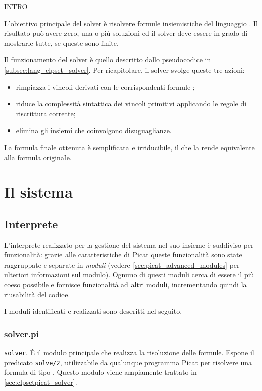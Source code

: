 \documentclass[12pt,a4paper,openright]{book} %
\begin{document}
\minitoc

INTRO

L'obiettivo principale del solver \clpset{} è risolvere formule insiemistiche del linguaggio \clpset{}. Il risultato può avere zero, una o più soluzioni ed il solver deve essere in grado di mostrarle tutte, se queste sono finite.

Il funzionamento del solver è quello descritto dallo pseudocodice in  \ref{subsec:lang_clpset_solver}. Per ricapitolare, il solver svolge queste tre azioni:
\begin{itemize}
\item rimpiazza i vincoli derivati con le corrispondenti formule \clpset{};
\item riduce la complessità sintattica dei vincoli primitivi applicando le regole di riscrittura corrette;
\item elimina gli insiemi che coinvolgono disuguaglianze.
\end{itemize} 
La formula finale ottenuta è semplificata e irriducibile, il che la rende equivalente alla formula originale.

\section{Il sistema}
\label{ch:clpsetpicat_system}

\subsection{Interprete}
\label{ch:clpsetpicat_system_interpreter}

L'interprete realizzato per la gestione del sistema nel suo insieme è suddiviso per funzionalità: grazie alle caratteristiche di Picat queste funzionalità sono state raggruppate e separate in \emph{moduli} (vedere \ref{sec:picat_advanced_modules} per ulteriori informazioni sul modulo). Ognuno di questi moduli cerca di essere il più coeso possibile e fornisce funzionalità ad altri moduli, incrementando quindi la riusabilità del codice.

I moduli identificati e realizzati sono descritti nel seguito.

\subsubsection{solver.pi}

\verb|solver|. \'E il modulo principale che realizza la risoluzione delle formule. Espone il predicato \verb|solve/2|, utilizzabile da qualunque programma Picat per risolvere una formula di tipo \clpset{}. Questo modulo viene ampiamente trattato in \ref{sec:clpsetpicat_solver}.
\end{document}
